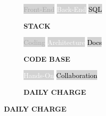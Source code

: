 \documentclass[9pt]{developercv} %
\begin{document}
 \begin{figure}[!ht]
 
\captionsetup[subfigure]{labelformat=empty}
\begin{subfigure}{.3\textwidth}
\centering
{}
{\colorbox{lightgray}{
\textcolor{darkgray}{Front-End}}
\break
\colorbox{lightgray}{
\textcolor{white}{Back-End}}
\break
\colorbox{lightgray}{
\textcolor{black}{SQL}}}
\caption{\textbf{STACK}}
\end{subfigure}%
\begin{subfigure}{.3\textwidth}
\centering
{}
{\colorbox{lightgray}{
\textcolor{darkgray}{Coding}}
\break
\colorbox{lightgray}{
\textcolor{white}{Architecture}}
\break
\colorbox{lightgray}{
\textcolor{black}{Docs}}}
\caption{\textbf{CODE BASE}}
\end{subfigure}%
\begin{subfigure}{.3\textwidth}
\centering
{}
{
\colorbox{lightgray}{
\textcolor{white}{Hands-On}}
\break
\colorbox{lightgray}{
\textcolor{black}{Collaboration}}}
\caption{\textbf{DAILY CHARGE}}
\end{subfigure}%
\end{figure}


      
     


\end{document}
